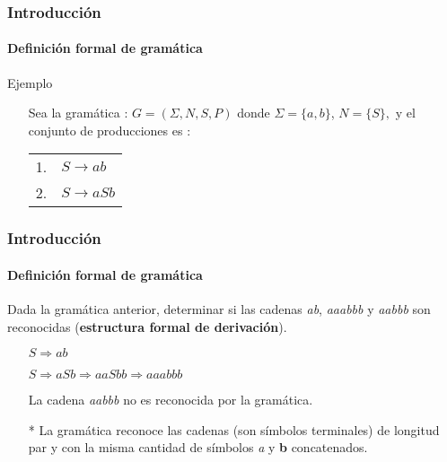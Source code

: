 \documentclass{beamer}
\begin{document}
        \begin{frame}
            \frametitle{Introducci\'on}
            \framesubtitle{Definici\'on formal de gram\'atica}

            \begin{exampleblock}{Ejemplo}
                \begin{itemize}
                    \item[\checkmark] Sea la gram\'atica : $G = (\Sigma, N, S , P)$ donde $\Sigma = \{a,b\}$, $N = \{S\},$ y el conjunto de producciones es : \\
                    \begin{flushleft}
                        \begin{tabular}{ll}
                            1. & $S \rightarrow ab$ \\
                            2. & $S \rightarrow aSb$
                        \end{tabular}
                    \end{flushleft}
                \end{itemize}
			\end{exampleblock}
		\end{frame}

        \begin{frame}
            \frametitle{Introducci\'on}
            \framesubtitle{Definici\'on formal de gram\'atica}

            \begin{exampleblock}{Dada la gram\'atica anterior, determinar si las cadenas \emph{ab}, \emph{aaabbb} y \emph{aabbb} son reconocidas (\textbf{estructura formal de derivaci\'on}).}
                \begin{itemize}
                    \item[] $S \Rightarrow ab$ \checkmark
                \end{itemize}
                \begin{itemize}
                    \item[] $S \Rightarrow aSb \Rightarrow aaSbb \Rightarrow aaabbb$ \checkmark
                \end{itemize}
                \begin{itemize}
                    \item[] La cadena \emph{aabbb} no es reconocida por la gram\'atica.
                \end{itemize}
                \begin{itemize}
                    \item[*] La gram\'atica reconoce las cadenas (son s\'imbolos terminales) de longitud par y con la misma cantidad de s\'imbolos \emph{a} y \textbf{b} concatenados.
                \end{itemize}
			\end{exampleblock}
		\end{frame}
\end{document}
